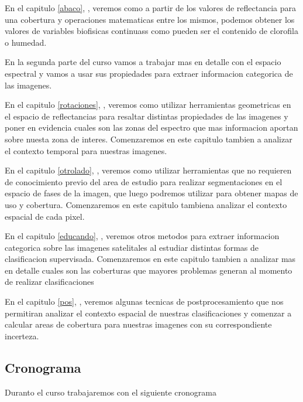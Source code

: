 En el capitulo \ref{abaco}, , veremos como a partir de los valores
de reflectancia para una cobertura y operaciones matematicas entre los mismos,
podemos obtener los valores de variables biofisicas continuass como pueden ser
el contenido de clorofila o humedad.

En la segunda parte del curso vamos a trabajar mas en detalle con el espacio
espectral y vamos a usar sus propiedades para extraer informacion categorica de
las imagenes.

En el capitulo \ref{rotaciones}, , veremos como utilizar
herramientas geometricas en el espacio de reflectancias para resaltar distintas
propiedades de las imagenes y poner en evidencia cuales son las zonas del espectro
que mas informacion aportan sobre nuesta zona de interes. Comenzaremos en este
capitulo tambien a analizar el contexto temporal para nuestras imagenes.

En el capitulo \ref{otrolado}, , veremos como utilizar herramientas
que no requieren de conocimiento previo del area de estudio para realizar segmentaciones
en el espacio de fases de la imagen, que luego podremos utilizar para obtener mapas
de uso y cobertura. Comenzaremos en este capitulo tambiena analizar el contexto
espacial de cada pixel.

En el capitulo \ref{educando}, , veremos otros metodos para extraer
informacion categorica sobre las imagenes satelitales al estudiar distintas
formas de clasificacion supervisada. Comenzaremos en este capitulo tambien a
analizar mas en detalle cuales son las coberturas que mayores problemas generan al
momento de realizar clasificaciones

En el capitulo \ref{pos}, , veremos algunas tecnicas de postprocesamiento
que nos permitiran analizar el contexto espacial de nuestras clasificaciones y
comenzar a calcular areas de cobertura para nuestras imagenes con su correspondiente incerteza.

\subsection{Cronograma}

Duranto el curso trabajaremos con el siguiente cronograma


